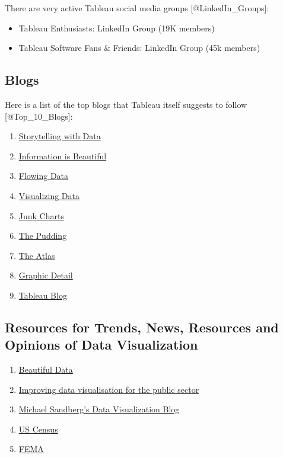 \documentclass[]{book}
\providecommand{\tightlist}{%
  \setlength{\itemsep}{0pt}\setlength{\parskip}{0pt}}
\theoremstyle{definition}
\theoremstyle{definition}
\theoremstyle{definition}
\theoremstyle{remark}
\begin{document}
There are very active Tableau social media groups
{[}@LinkedIn\_Groups{]}:

\begin{itemize}
\tightlist
\item
  Tableau Enthusiasts: LinkedIn Group (19K members)
\item
  Tableau Software Fans \& Friends: LinkedIn Group (45k members)
\end{itemize}

\subsection{Blogs}\label{blogs}

Here is a list of the top blogs that Tableau itself suggests to follow
{[}@Top\_10\_Blogs{]}:

\begin{enumerate}
\def\labelenumi{\arabic{enumi}.}
\item
  \href{http://www.storytellingwithdata.com/}{Storytelling with Data}
\item
  \href{https://informationisbeautiful.net/}{Information is Beautiful}
\item
  \href{https://flowingdata.com/}{Flowing Data}
\item
  \href{http://www.visualisingdata.com/}{Visualizing Data}
\item
  \href{http://junkcharts.typepad.com/}{Junk Charts}
\item
  \href{https://pudding.cool/}{The Pudding}
\item
  \href{https://www.theatlas.com/}{The Atlas}
\item
  \href{https://www.economist.com/blogs/graphicdetail}{Graphic Detail}
\item
  \href{https://www.tableau.com/about/blog}{Tableau Blog}
\end{enumerate}

\subsection{Resources for Trends, News, Resources and Opinions of Data
Visualization}\label{resources-for-trends-news-resources-and-opinions-of-data-visualization}

\begin{enumerate}
\def\labelenumi{\arabic{enumi}.}
\setcounter{enumi}{1}
\tightlist
\item
  \href{http://beautifuldata.net/}{Beautiful Data}
\item
  \href{http://www.improving-visualisation.org/}{Improving data
  visualisation for the public sector}
\item
  \href{https://datavizblog.com/}{Michael Sandberg's Data Visualization
  Blog}
\item
  \href{https://www.census.gov/dataviz/}{US Census}
\item
  \href{https://www.fema.gov/data-visualization}{FEMA}
\end{enumerate}
\end{document}
